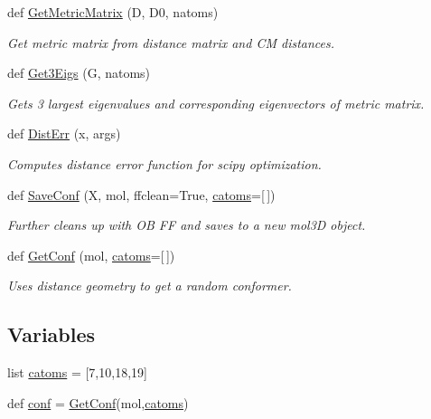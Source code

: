 \begin{DoxyCompactItemize}
def \hyperlink{namespacemolSimplify_1_1distgeom_a6d508087b38951d64ecc00438d3139d3}{Get\+Metric\+Matrix} (D, D0, natoms)
\begin{DoxyCompactList}\small\item\em Get metric matrix from distance matrix and CM distances. \end{DoxyCompactList}\item 
def \hyperlink{namespacemolSimplify_1_1distgeom_a2a9f4b671337bde3a1a15d9adef28959}{Get3\+Eigs} (G, natoms)
\begin{DoxyCompactList}\small\item\em Gets 3 largest eigenvalues and corresponding eigenvectors of metric matrix. \end{DoxyCompactList}\item 
def \hyperlink{namespacemolSimplify_1_1distgeom_a9393f464d0cdef4e6ad87bcc895767d2}{Dist\+Err} (x, args)
\begin{DoxyCompactList}\small\item\em Computes distance error function for scipy optimization. \end{DoxyCompactList}\item 
def \hyperlink{namespacemolSimplify_1_1distgeom_a6117d1a32fc76bdb45be5286ccd0f560}{Save\+Conf} (X, mol, ffclean=True, \hyperlink{namespacemolSimplify_1_1distgeom_a3aab6d25e8f34a4b314e6ae3e33b5655}{catoms}=\mbox{[}$\,$\mbox{]})
\begin{DoxyCompactList}\small\item\em Further cleans up with OB FF and saves to a new mol3D object. \end{DoxyCompactList}\item 
def \hyperlink{namespacemolSimplify_1_1distgeom_a4e88fd4f6eafcb693dfcc7cba4ee42a7}{Get\+Conf} (mol, \hyperlink{namespacemolSimplify_1_1distgeom_a3aab6d25e8f34a4b314e6ae3e33b5655}{catoms}=\mbox{[}$\,$\mbox{]})
\begin{DoxyCompactList}\small\item\em Uses distance geometry to get a random conformer. \end{DoxyCompactList}\end{DoxyCompactItemize}
\subsection*{Variables}
\begin{DoxyCompactItemize}
\item 
list \hyperlink{namespacemolSimplify_1_1distgeom_a3aab6d25e8f34a4b314e6ae3e33b5655}{catoms} = \mbox{[}7,10,18,19\mbox{]}
\item 
def \hyperlink{namespacemolSimplify_1_1distgeom_afe6a1a0b7b2279c05a6fd4ddd6364057}{conf} = \hyperlink{namespacemolSimplify_1_1distgeom_a4e88fd4f6eafcb693dfcc7cba4ee42a7}{Get\+Conf}(mol,\hyperlink{namespacemolSimplify_1_1distgeom_a3aab6d25e8f34a4b314e6ae3e33b5655}{catoms})
\end{DoxyCompactItemize}


